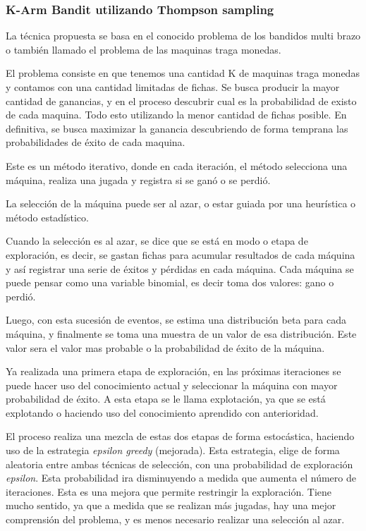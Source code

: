 \documentclass[11pt,a4paper,twoside]{thesis}
\begin{document}
\subsubsection{K-Arm Bandit utilizando Thompson sampling}

La técnica propuesta se basa en el conocido problema de los bandidos multi
brazo o también llamado el problema de las maquinas traga monedas.

El problema consiste en que tenemos una cantidad K de maquinas traga monedas y
contamos con una cantidad limitadas de fichas. Se busca producir la mayor
cantidad de ganancias, y en el proceso descubrir cual es la probabilidad de
existo de cada maquina. Todo esto utilizando la menor cantidad de fichas
posible. En definitiva, se busca maximizar la ganancia descubriendo de forma
temprana las probabilidades de éxito de cada maquina.

Este es un método iterativo, donde en cada iteración, el método selecciona una
máquina, realiza una jugada y registra si se ganó o se perdió.

La selección de la máquina puede ser al azar, o estar guiada por una heurística
o método estadístico.

Cuando la selección es al azar, se dice que se está en modo o etapa de
exploración, es decir, se gastan fichas para acumular resultados de cada
máquina y así registrar una serie de éxitos y pérdidas en cada máquina. Cada
máquina se puede pensar como una variable binomial, es decir toma dos valores:
gano o perdió.

Luego, con esta sucesión de eventos, se estima una distribución beta para cada
máquina, y finalmente se toma una muestra de un valor de esa distribución. Este
valor sera el valor mas probable o la probabilidad de éxito de la máquina.

Ya realizada una primera etapa de exploración, en las próximas iteraciones se
puede hacer uso del conocimiento actual y seleccionar la máquina con mayor
probabilidad de éxito. A esta etapa se le llama explotación, ya que se está
explotando o haciendo uso del conocimiento aprendido con anterioridad.

El proceso realiza una mezcla de estas dos etapas de forma estocástica,
haciendo uso de la estrategia \textit{epsilon greedy} (mejorada). Esta
estrategia, elige de forma aleatoria entre ambas técnicas de selección, con una
probabilidad de exploración \textit{epsilon}. Esta probabilidad ira
disminuyendo a medida que aumenta el número de iteraciones. Esta es una mejora
que permite restringir la exploración. Tiene mucho sentido, ya que a medida que
se realizan más jugadas, hay una mejor comprensión del problema, y es menos
necesario realizar una selección al azar.
\end{document}

